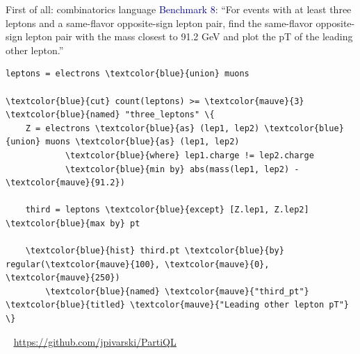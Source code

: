 \documentclass[aspectratio=169]{beamer}
\begin{document}
\begin{frame}[fragile]{First of all: combinatorics language}
\vspace{0.3 cm}
\textcolor{darkblue}{Benchmark 8}: ``For events with at least three leptons and a same-flavor opposite-sign lepton pair, find the same-flavor opposite-sign lepton pair with the mass closest to 91.2 GeV and plot the pT of the leading other lepton.''

\small
\vspace{0.2 cm}
\begin{Verbatim}[commandchars=\\\{\}]
leptons = electrons \textcolor{blue}{union} muons

\textcolor{blue}{cut} count(leptons) >= \textcolor{mauve}{3} \textcolor{blue}{named} "three_leptons" \{
    Z = electrons \textcolor{blue}{as} (lep1, lep2) \textcolor{blue}{union} muons \textcolor{blue}{as} (lep1, lep2)
            \textcolor{blue}{where} lep1.charge != lep2.charge
            \textcolor{blue}{min by} abs(mass(lep1, lep2) - \textcolor{mauve}{91.2})

    third = leptons \textcolor{blue}{except} [Z.lep1, Z.lep2] \textcolor{blue}{max by} pt

    \textcolor{blue}{hist} third.pt \textcolor{blue}{by} regular(\textcolor{mauve}{100}, \textcolor{mauve}{0}, \textcolor{mauve}{250})
        \textcolor{blue}{named} \textcolor{mauve}{"third_pt"} \textcolor{blue}{titled} \textcolor{mauve}{"Leading other lepton pT"}
\}
\end{Verbatim}

\mbox{ } \hfill \textcolor{blue}{\underline{\url{https://github.com/jpivarski/PartiQL}}} \hfill \mbox{ }
\end{frame}
\end{document}
